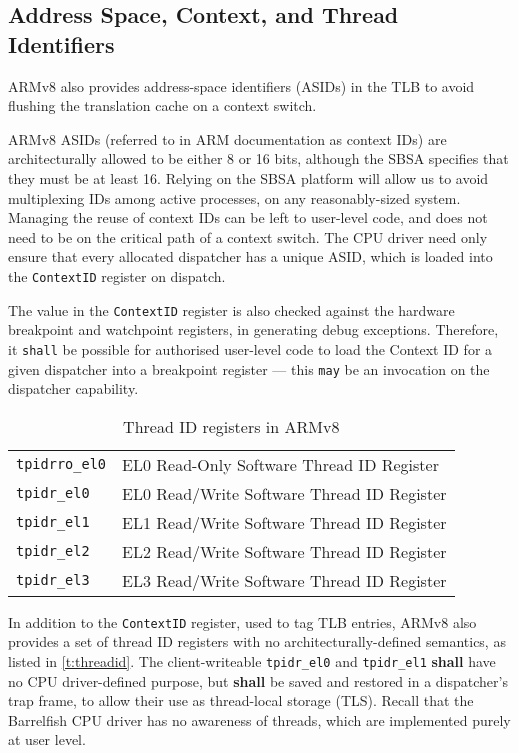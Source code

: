 \documentclass[a4paper,twoside]{report}
\begin{document}
\subsection{Address Space, Context, and Thread Identifiers}

ARMv8 also provides address-space identifiers (ASIDs) in the TLB to avoid
flushing the translation cache on a context switch.

ARMv8 ASIDs (referred to in ARM documentation as context IDs) are
architecturally allowed to be either 8 or 16 bits, although the SBSA
specifies that they must be at least 16. Relying on the SBSA platform will
allow us to avoid multiplexing IDs among active processes, on any
reasonably-sized system.  Managing the reuse of context IDs can be left to
user-level code, and does not need to be on the critical path of a context
switch. The CPU driver need only ensure that every allocated dispatcher has a
unique ASID, which is loaded into the \texttt{ContextID} register on dispatch.

The value in the \texttt{ContextID} register is also checked against the
hardware breakpoint and watchpoint registers, in generating debug exceptions.
Therefore, it \texttt{shall} be possible for authorised user-level code to
load the Context ID for a given dispatcher into a breakpoint register --- this
\texttt{may} be an invocation on the dispatcher capability.

\begin{table}
\begin{center}
\begin{tabular}{ll}
\texttt{tpidrro\_el0} & EL0 Read-Only Software Thread ID Register \\
\texttt{tpidr\_el0} & EL0 Read/Write Software Thread ID Register \\
\texttt{tpidr\_el1} & EL1 Read/Write Software Thread ID Register \\
\texttt{tpidr\_el2} & EL2 Read/Write Software Thread ID Register \\
\texttt{tpidr\_el3} & EL3 Read/Write Software Thread ID Register \\
\end{tabular}
\end{center}
\caption{Thread ID registers in ARMv8}
\label{t:threadid}
\end{table}

In addition to the \texttt{ContextID} register, used to tag TLB entries, ARMv8
also provides a set of thread ID registers with no architecturally-defined
semantics, as listed in \autoref{t:threadid}. The client-writeable
\texttt{tpidr\_el0} and \texttt{tpidr\_el1} \textbf{shall} have no CPU
driver-defined purpose, but \textbf{shall} be saved and restored in a
dispatcher's trap frame, to allow their use as thread-local storage (TLS).
Recall that the Barrelfish CPU driver has no awareness of threads, which are
implemented purely at user level.
\end{document}
